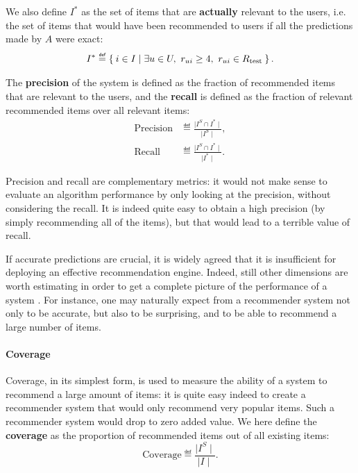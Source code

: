 We also define $I^*$ as the set of items that are \textbf{actually} relevant to
the users, i.e.  the set of items that would have been recommended to users if
all the predictions made by $A$ were exact:
$$I^* \eqdef \Set{i \in I | \exists u \in U, ~\rui \geq 4,~ \rui \in \Rtest}.$$

\noindent
The \textbf{precision} of the
system is
defined as the fraction of recommended items that are relevant to the users,
and the \textbf{recall} is defined as the fraction of relevant recommended
items over all relevant items:
\begin{align*}
  \text{Precision} &\eqdef \frac{\mid I^S \cap I^*\mid}{\mid I^S \mid},\\
  \text{Recall} &\eqdef \frac{\mid I^S \cap I^*\mid}{\mid I^* \mid}.
\end{align*}

Precision and recall are complementary metrics: it would not make sense to
evaluate an algorithm performance by only looking at the precision, without
considering the recall. It is indeed quite easy to obtain a high precision (by
simply recommending all of the items), but that would lead to a terrible
value of recall.

If accurate predictions are crucial, it is widely agreed that it is
insufficient for deploying an effective recommendation engine. Indeed, still
other dimensions are worth estimating in order to get a complete picture of the
performance of a system
\cite{NeeRieKonACM2006,HerKonJohTerRieACM2004,KamBriRecSys2014}.  For instance,
one may naturally expect from a recommender system not only to be accurate, but
also to be surprising, and to be able to recommend a large number of items.

\paragraph{Coverage\\}
Coverage, in its simplest form, is used to measure the ability of a system to
recommend a large amount of items: it is quite easy indeed to create a
recommender system that would only recommend very popular items. Such a
recommender system would drop to zero added value. We here define the
\textbf{coverage} as the proportion of recommended items out of all existing
items:
$$\text{Coverage} \eqdef \frac{\mid I^S\mid}{\mid I\mid}.$$

